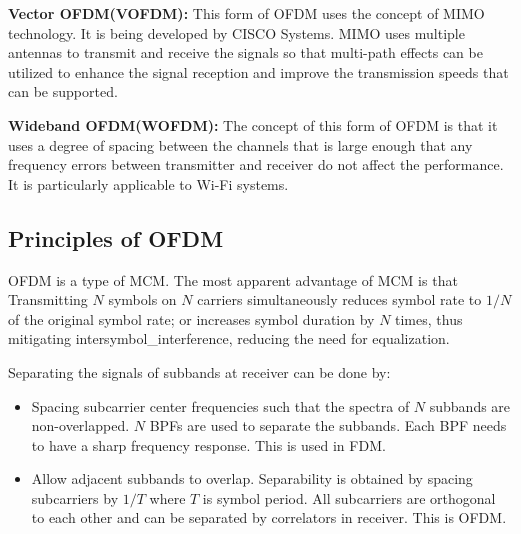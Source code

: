\textbf{Vector OFDM(VOFDM):} This form of \gls{OFDM} uses the concept of \gls{MIMO} technology. It is being developed by CISCO Systems. \gls{MIMO}  uses multiple antennas to transmit and receive the signals so that multi-path effects can be utilized to enhance the signal reception and improve the transmission speeds that can be supported.

\textbf{Wideband \gls{OFDM}(WOFDM):} The concept of this form of OFDM is that it uses a degree of spacing between the channels that is large enough that any frequency errors between transmitter and receiver do not affect the performance. It is particularly applicable to Wi-Fi systems.

 

\subsection{Principles of OFDM}
OFDM is a type of \gls{MCM}\cite{fuqin}. The most apparent advantage of \gls{MCM} is that Transmitting $N$ symbols on $N$ carriers simultaneously reduces symbol rate to $1/N$ of the original symbol rate; or increases symbol duration by $N$ times, thus mitigating \gls{intersymbol_interference}, reducing the need for \gls{equalization}.

Separating the signals of \gls{subband}s at receiver can be done by:
\begin{itemize}
	\item Spacing subcarrier center frequencies such that the spectra of $N$ \gls{subband}s are non-overlapped. $N$
	\gls{BPF}s are used to separate the \gls{subband}s. Each \gls{BPF} needs to have a sharp frequency response. This is used in \gls{FDM}.
	\item Allow adjacent \gls{subband}s to overlap. Separability is obtained by spacing \gls{subcarrier}s by $1/T$ where $T$ is symbol period. All \gls{subcarrier}s are \gls{orthogonal} to each other and can be separated by correlators in receiver. This is \gls{OFDM}.
\end{itemize}

